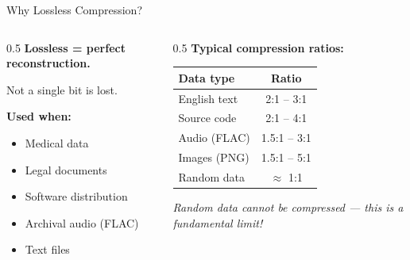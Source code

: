 \documentclass[aspectratio=169,12pt]{beamer}
\begin{document}
\begin{frame}{Why Lossless Compression?}
    \begin{columns}
        \begin{column}{0.5\textwidth}
            \textbf{Lossless = perfect reconstruction.}
            
            Not a single bit is lost.
            
            \vspace{0.3cm}
            \textbf{Used when:}
            \begin{itemize}
                \item Medical data
                \item Legal documents
                \item Software distribution
                \item Archival audio (FLAC)
                \item Text files
            \end{itemize}
        \end{column}
        \begin{column}{0.5\textwidth}
            \textbf{Typical compression ratios:}
            \begin{center}
                \begin{tabular}{l|c}
                    \toprule
                    Data type & Ratio \\
                    \midrule
                    English text & 2:1 -- 3:1 \\
                    Source code & 2:1 -- 4:1 \\
                    Audio (FLAC) & 1.5:1 -- 3:1 \\
                    Images (PNG) & 1.5:1 -- 5:1 \\
                    Random data & $\approx$ 1:1 \\
                    \bottomrule
                \end{tabular}
            \end{center}
            
            \textit{Random data cannot be compressed --- this is a fundamental limit!}
        \end{column}
    \end{columns}
\end{frame}
\end{document}
